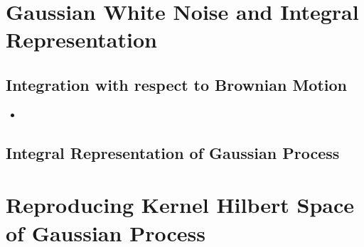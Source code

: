 \documentclass[11pt]{article}
\begin{document}
\section{Gaussian White Noise and Integral Representation}
\subsection{Integration with respect to Brownian Motion}
\begin{itemize}
\item 
\end{itemize}
\subsection{Integral Representation of Gaussian Process}

\section{Reproducing Kernel Hilbert Space of Gaussian Process}
\end{document}
